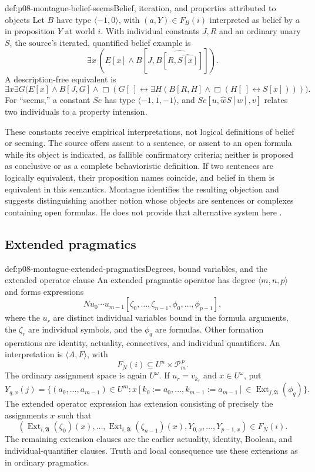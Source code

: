 \begin{hbexample}{def:p08-montague-belief-seems}{Belief, iteration, and properties attributed to objects}
Let \(B\) have type \(\langle-1,0\rangle\), with
\((a,Y)\in F_B(i)\) interpreted as belief by \(a\) in proposition
\(Y\) at world \(i\). With individual constants \(J,R\) and an
ordinary unary \(S\), the source's iterated, quantified belief example is
\[
 \exists x\,(E[x]\land B[J,\widehat{B[R,\widehat{S[x]}]}]).
\]
A description-free equivalent is
\[
 \exists x\exists G\bigl(E[x]\land B[J,G]\land
 \Box(G[\ ]\leftrightarrow
       \exists H(B[R,H]\land\Box(H[\ ]\leftrightarrow S[x])))\bigr).
\]
For ``seems,'' a constant \(\mathit{Se}\) has type
\(\langle-1,1,-1\rangle\), and
\(\mathit{Se}[u,\widehat w S[w],v]\) relates two individuals to a
property intension.

These constants receive empirical interpretations, not logical
definitions of belief or seeming. The source offers assent to a sentence,
or assent to an open formula while its object is indicated, as fallible
confirmatory criteria; neither is proposed as conclusive or as a complete
behavioristic definition. If two sentences are logically equivalent,
their proposition names coincide, and belief in them is equivalent in
this semantics. Montague identifies the resulting objection and suggests
distinguishing another notion whose objects are sentences or complexes
containing open formulas. He does not provide that alternative system
here \cite[pp.~84--86; notes~10--11]{Montague1970Pragmatics}.
\end{hbexample}

\subsection{Extended pragmatics}

\begin{hbdefinition}{def:p08-montague-extended-pragmatics}{Degrees, bound variables, and the extended operator clause}
An extended pragmatic operator has degree \(\langle m,n,p\rangle\)
and forms expressions
\[
 N u_0\cdots u_{m-1}
       [\zeta_0,\ldots,\zeta_{n-1},\phi_0,\ldots,\phi_{p-1}],
\]
where the \(u_r\) are distinct individual variables bound in the
formula arguments, the \(\zeta_r\) are individual symbols, and
the \(\phi_q\) are formulas. Other formation operations are identity,
actuality, connectives, and individual quantifiers. An interpretation
is \(\langle A,F\rangle\), with
\[
 F_N(i)\subseteq U^n\times\mathcal P_m^{\,p}.
\]
The ordinary assignment space is again \(U^\omega\). If \(u_r=v_{k_r}\)
and \(x\in U^\omega\), put
\[
 Y_{q,x}(j)=\{(a_0,\ldots,a_{m-1})\in U^m:
       x[k_0:=a_0,\ldots,k_{m-1}:=a_{m-1}]
              \in\operatorname{Ext}_{j,\mathfrak A}(\phi_q)\}.
\]
The extended operator expression has extension consisting of precisely
the assignments \(x\) such that
\[
 (\operatorname{Ext}_{i,\mathfrak A}(\zeta_0)(x),\ldots,
  \operatorname{Ext}_{i,\mathfrak A}(\zeta_{n-1})(x),
  Y_{0,x},\ldots,Y_{p-1,x})\in F_N(i).
\]
The remaining extension clauses are the earlier actuality, identity,
Boolean, and individual-quantifier clauses. Truth and local consequence
use these extensions as in ordinary pragmatics.
\end{hbdefinition}

